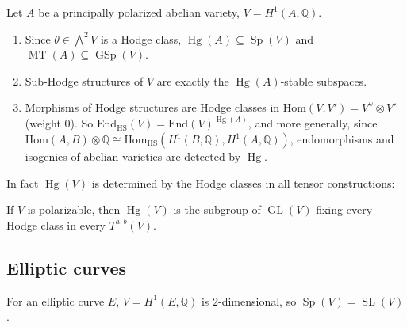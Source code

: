 \documentclass[12pt]{amsart}
\newcommand{\Q}{\mathbb{Q}}
\newcommand{\End}{\text{End}}
\newcommand{\Hom}{\text{Hom}}
\DeclareMathOperator{\GL}{GL}
\DeclareMathOperator{\SL}{SL}
\DeclareMathOperator{\Sp}{Sp}
\DeclareMathOperator{\GSp}{GSp}
\DeclareMathOperator{\MT}{MT}
\DeclareMathOperator{\Hg}{Hg}
\let\oldbigwedge\bigwedge
\renewcommand{\bigwedge}{\mathop{\textstyle\oldbigwedge}\nolimits}
\theoremstyle{definition}
\theoremstyle{remark}
\numberwithin{equation}{section}
\begin{document}
\begin{corollary}\label{cor:key}
    Let $A$ be a principally polarized abelian variety, $V = H^1(A, \Q)$.
    \begin{enumerate}[label=(\alph*)]
        \item Since $\theta \in \bigwedge^2 V$ is a Hodge class,
        $\Hg(A) \subseteq \Sp(V)$ and $\MT(A) \subseteq \GSp(V)$.
        \item Sub-Hodge structures of $V$ are exactly the $\Hg(A)$-stable
        subspaces.
        \item Morphisms of Hodge structures are Hodge classes in
        $\Hom(V, V') = V^\vee \otimes V'$ (weight $0$). So
        $\End_{\mathrm{HS}}(V) = \End(V)^{\Hg(A)}$, and more generally, since
        $\Hom(A, B) \otimes \Q \cong \Hom_{\mathrm{HS}}(H^1(B,\Q), H^1(A,\Q))$,
        endomorphisms and isogenies of abelian varieties are detected by $\Hg$.
    \end{enumerate}
\end{corollary}

In fact $\Hg(V)$ is determined by the Hodge classes in all tensor constructions:

\begin{fact}\label{fact:deligne}
    If $V$ is polarizable, then $\Hg(V)$ is the subgroup of $\GL(V)$ fixing
    every Hodge class in every $T^{a,b}(V)$.
\end{fact}

\subsection{Elliptic curves}
For an elliptic curve $E$, $V = H^1(E, \Q)$ is $2$-dimensional, so
$\Sp(V) = \SL(V)$.
\end{document}
